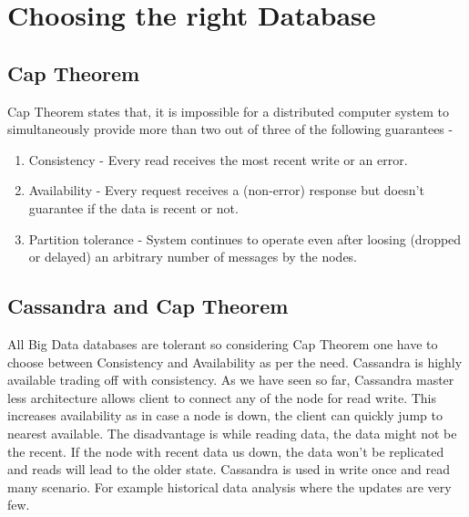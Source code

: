 \documentclass[9pt,twocolumn,twoside]{../../styles/osajnl}
\begin{document}
\section{Choosing the right Database}
\subsection{Cap Theorem}
Cap Theorem \cite{wiki-cap-thrm} states that, it is impossible for a distributed computer system to simultaneously provide more than two out of three of the following guarantees -
\begin{enumerate}
     \item Consistency - Every read receives the most recent write or an error.
     \item Availability -  Every request receives a (non-error) response but doesn't guarantee if the data is recent or not.
     \item Partition tolerance - System continues to operate even after loosing (dropped or delayed) an arbitrary number of messages  by the nodes.
\end{enumerate}

\subsection{Cassandra and Cap Theorem}
All Big Data databases are tolerant so considering Cap Theorem one have to choose between Consistency and Availability as per the need. Cassandra is highly available trading off with consistency. As we have seen so far, Cassandra master less architecture allows client to connect any of the node for read write. This increases availability as in case a node is down, the client can quickly jump to nearest available. The disadvantage is while reading data, the data might not be the recent. If the node with recent data us down, the data won't be replicated and reads will lead to the older state. Cassandra is used in write once and read many scenario. For example historical data analysis where the updates are very few. 
\end{document}
